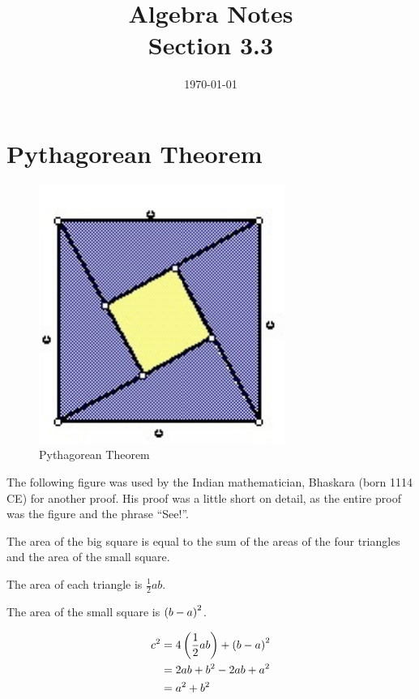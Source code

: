 \documentclass[letterpaper, landscape]{exam}
\title{Algebra Notes \\ Section 3.3 }
\author{}
\date{\today}
\begin{document}
  \maketitle

  \section{Pythagorean Theorem} %

  \begin{figure}[H]
    \centering
    \includegraphics{proof.pdf}
    \caption{Pythagorean Theorem}
  \end{figure}
  
  The following figure was used by the Indian mathematician, Bhaskara (born 1114 CE) for another
  proof.  His proof was a little short on detail, as the entire proof was the figure and the phrase
  ``See!''.  

  The area of the big square is equal to the sum of the areas of the four triangles and the area
  of the small square.

  \begin{itemize*} 
    \item The area of each triangle is $\frac{1}{2} ab $.
    \item The area of the small square is $\del{ b - a }^2$.  
  \end{itemize*}

  \begin{align*} 
    c^2 & = 4 \del{ \frac{1}{2} ab } + \del{ b - a }^2 \\
        & = 2ab + b^2 - 2ab + a^2 \\
        & = a^2 + b^2 \\
  \end{align*}
\end{document}
